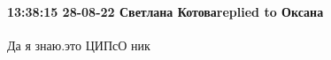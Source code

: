  
 
 
 
 

\paragraph{13:38:15 28-08-22 Светлана Котоваreplied to Оксана}

Да я знаю.это ЦИПсО ник

